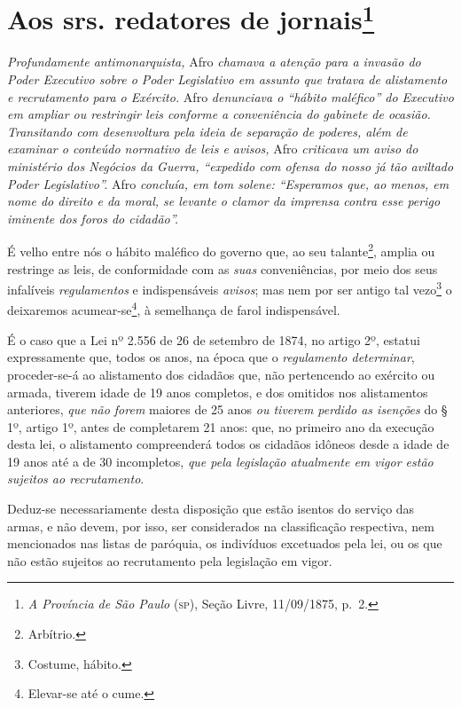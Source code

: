 \chapter{Aos srs. redatores de jornais\footnote{\emph{A Província de São Paulo} (\textsc{sp}), Seção Livre,
  11/09/1875, p.~2.}} %

\begin{didascalia}
\emph{Profundamente antimonarquista,} Afro \emph{chamava a atenção para
a invasão do Poder Executivo sobre o Poder Legislativo em assunto que
tratava de alistamento e recrutamento para o Exército.} Afro
\emph{denunciava o ``hábito maléfico'' do Executivo em ampliar ou
restringir leis conforme a conveniência do gabinete de ocasião.
Transitando com desenvoltura pela ideia de separação de poderes, além de
examinar o conteúdo normativo de leis e avisos,} Afro \emph{criticava um
aviso do ministério dos Negócios da Guerra, ``expedido com ofensa do
nosso já tão aviltado Poder Legislativo''.} Afro \emph{concluía, em tom
solene: ``Esperamos que, ao menos, em nome do direito e da moral, se
levante o clamor da imprensa contra esse perigo iminente dos foros do
cidadão''.}
\end{didascalia}

É velho entre nós o hábito maléfico do governo que, ao seu
talante\footnote{ Arbítrio.}, amplia ou restringe as leis, de
conformidade com as \emph{suas} conveniências, por meio dos seus
infalíveis \emph{regulamentos} e indispensáveis \emph{avisos}; mas nem
por ser antigo tal vezo\footnote{ Costume, hábito.} o deixaremos
acumear-se\footnote{ Elevar-se até o cume.}, à semelhança de farol
indispensável.

É o caso que a Lei nº 2.556 de 26 de setembro de 1874, no artigo 2º,
estatui expressamente que, todos os anos, na época que o
\emph{regulamento determinar}, proceder-se-á ao alistamento dos cidadãos
que, não pertencendo ao exército ou armada, tiverem idade de 19 anos
completos, e dos omitidos nos alistamentos anteriores, \emph{que não
forem} maiores de 25 anos \emph{ou tiverem perdido as isenções} do § 1º,
artigo 1º, antes de completarem 21 anos: que, no primeiro ano da
execução desta lei, o alistamento compreenderá todos os cidadãos idôneos
desde a idade de 19 anos até a de 30 incompletos, \emph{que pela
legislação atualmente em vigor estão sujeitos ao recrutamento}.

Deduz-se necessariamente desta disposição que estão isentos do serviço
das armas, e não devem, por isso, ser considerados na classificação
respectiva, nem mencionados nas listas de paróquia, os indivíduos
excetuados pela lei, ou os que não estão sujeitos ao recrutamento pela
legislação em vigor.

